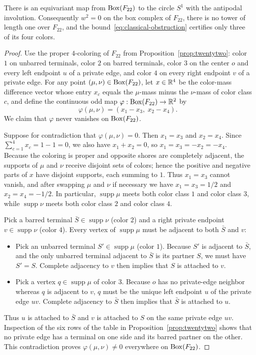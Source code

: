 \begin{proposition}\label{prop:no-seed}
There is an equivariant map from $\operatorname{Box}(F_{22})$ to the circle $S^1$ with the antipodal involution. Consequently $w^2=0$ on the box complex of $F_{22}$, there is no tower of length one over $F_{22}$, and the bound~\eqref{eq:classical-obstruction} certifies only three of its four colors.
\end{proposition}
\begin{proof}
Use the proper $4$-coloring of $F_{22}$ from Proposition~\ref{prop:twentytwo}: color $1$ on unbarred terminals, color $2$ on barred terminals, color $3$ on the center $o$ and every left endpoint $u$ of a private edge, and color $4$ on every right endpoint $v$ of a private edge. For any point $(\mu,\nu)\in\operatorname{Box}(F_{22})$, let $x\in\mathbb R^4$ be the color-mass difference vector whose entry $x_c$ equals the $\mu$-mass minus the $\nu$-mass of color class $c$, and define the continuous odd map $\varphi:\operatorname{Box}(F_{22})\to\mathbb R^2$ by
\[
 \varphi(\mu,\nu)=(x_1-x_3,\;x_2-x_4).
\]
We claim that $\varphi$ never vanishes on $\operatorname{Box}(F_{22})$.

Suppose for contradiction that $\varphi(\mu,\nu)=0$. Then $x_1=x_3$ and $x_2=x_4$. Since $\sum_{c=1}^4 x_c=1-1=0$, we also have $x_1+x_2=0$, so $x_1=x_3=-x_2=-x_4$. Because the coloring is proper and opposite shores are completely adjacent, the supports of $\mu$ and $\nu$ receive disjoint sets of colors; hence the positive and negative parts of $x$ have disjoint supports, each summing to $1$. Thus $x_1=x_3$ cannot vanish, and after swapping $\mu$ and $\nu$ if necessary we have $x_1=x_3=1/2$ and $x_2=x_4=-1/2$. In particular, $\operatorname{supp}\mu$ meets both color class $1$ and color class $3$, while $\operatorname{supp}\nu$ meets both color class $2$ and color class $4$.

Pick a barred terminal $\bar S\in\operatorname{supp}\nu$ (color $2$) and a right private endpoint $v\in\operatorname{supp}\nu$ (color $4$). Every vertex of $\operatorname{supp}\mu$ must be adjacent to both $\bar S$ and $v$:
\begin{itemize}
\item Pick an unbarred terminal $S'\in\operatorname{supp}\mu$ (color $1$). Because $S'$ is adjacent to $\bar S$, and the only unbarred terminal adjacent to $\bar S$ is its partner $S$, we must have $S'=S$. Complete adjacency to $v$ then implies that $S$ is attached to $v$.
\item Pick a vertex $q\in\operatorname{supp}\mu$ of color $3$. Because $o$ has no private-edge neighbor whereas $q$ is adjacent to $v$, $q$ must be the unique left endpoint $u$ of the private edge $uv$. Complete adjacency to $\bar S$ then implies that $\bar S$ is attached to $u$.
\end{itemize}
Thus $u$ is attached to $\bar S$ and $v$ is attached to $S$ on the same private edge $uv$. Inspection of the six rows of the table in Proposition~\ref{prop:twentytwo} shows that no private edge has a terminal on one side and its barred partner on the other. This contradiction proves $\varphi(\mu,\nu)\ne0$ everywhere on $\operatorname{Box}(F_{22})$.


\end{proof}
